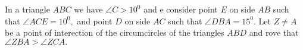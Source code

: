 In a  triangle $ABC$  we have  $\angle C>10^0$ and  e  consider  point  $E$  on side  $AB$  such that  $\angle ACE=10^0,$ and point  $D$ on side $AC$  such that  $\angle DBA=15^0.$ Let  $Z\neq A$ be a point  of interection of  the  circumcircles of  the triangles  $ABD$ and rove that  $\angle ZBA>\angle ZCA.$